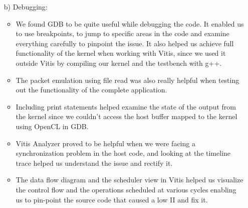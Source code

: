 \documentclass[../main.tex]{subfiles}
\begin{document}
\begin{enumerate}
    \item[b)] Debugging:
    \begin{itemize}
        \item We found GDB to be quite useful while debugging the code. It enabled us to use breakpoints, to jump to specific areas in the code and examine everything carefully to pinpoint the issue. It also helped us achieve full functionality of the kernel when working with Vitis, since we used it outside Vitis by compiling our kernel and the testbench with g++.\\
        \item The packet emulation using file read was also really helpful when testing out the functionality of the complete application.\\
        \item Including print statements helped examine the state of the output from the kernel since we couldn’t access the host buffer mapped to the kernel using OpenCL in GDB. \\
        \item Vitis Analyzer proved to be helpful when we were facing a synchronization problem in the host code, and looking at the timeline trace helped us understand the issue and rectify it. \\
        \item The data flow diagram and the scheduler view in Vitis helped us visualize the control flow and the operations scheduled at various cycles enabling us to pin-point the source code that caused a low II and fix it. \\
    \end{itemize}


\end{enumerate}
\end{document}

